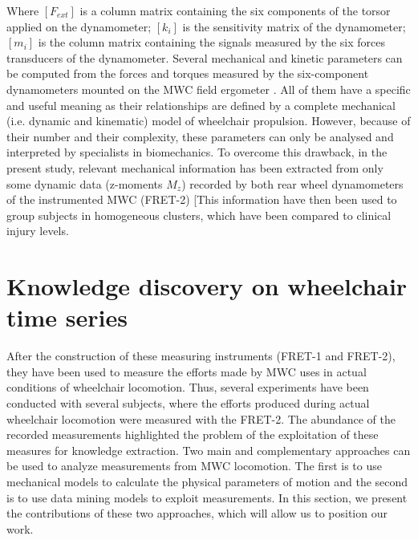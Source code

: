 Where $\left[F_{ext}\right]$ is a column matrix containing the six components of the torsor applied on the dynamometer; $\left[k_{i}\right]$ is the sensitivity matrix of the dynamometer;  $\left[m_{i}\right]$ is the column matrix containing the signals measured by the six forces transducers of the dynamometer.
Several mechanical and kinetic parameters can be computed from the forces and torques measured by the six-component dynamometers mounted on the MWC field ergometer \cite{Sauret2010}. All of them have a specific and useful meaning as their relationships are defined by a complete mechanical (i.e. dynamic and kinematic) model of wheelchair propulsion. However, because of their number and their complexity, these parameters can only be analysed and interpreted by specialists in biomechanics. To overcome this drawback, in the present study, relevant mechanical information has been extracted from only some dynamic data (z-moments $M_z$) recorded by both rear wheel dynamometers of the instrumented MWC (FRET-2) [This information have then been used to group subjects in homogeneous clusters, which have been compared to clinical injury levels.

\section[Wheelchair time series]{Knowledge discovery on wheelchair time series}
\label{mechanical_model}
After the construction of these measuring instruments (FRET-1 and FRET-2), they have been used to measure the efforts made by MWC uses in actual conditions of wheelchair locomotion. Thus, several experiments have been conducted with several subjects,  where the efforts produced during actual wheelchair locomotion were measured with the FRET-2. The abundance of the recorded measurements highlighted the problem of the exploitation of these measures for knowledge extraction. Two main and complementary approaches can be used to analyze measurements from MWC locomotion. The first is to use mechanical models to calculate the physical parameters of motion and the second is to use data mining models to exploit measurements.  In this section, we present the contributions of these two approaches, which will allow us to position our work.



